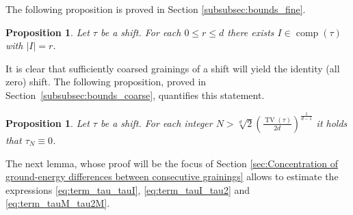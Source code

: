 \documentclass[11pt, reqno]{amsart}
\newtheorem{proposition}[theorem]{Proposition}
\DeclareMathOperator{\TV}{TV}
\DeclareMathOperator{\comp}{comp}
\numberwithin{equation}{section}
\begin{document}
The following proposition is proved in Section \ref{subsubsec:bounds_fine}. 
\begin{proposition}\label{prop:Itau}
Let $\tau$ be a shift. For each $0\le r\le d$ there exists $I\in\comp(\tau)$ with $|I|=r$.
\end{proposition}
It is clear that sufficiently coarsed grainings of a shift will yield the identity (all zero) shift. The following proposition, proved in Section~\ref{subsubsec:bounds_coarse}, quantifies this statement.
\begin{proposition}\label{prop:coarse graining to the identity}
Let $\tau$ be a shift. 
For each integer $N>\sqrt[d]{2}\left(\frac{\TV\left(\tau\right)}{2d}\right)^{\frac{1}{d-1}}$ 
it holds that 
$\tau_N\equiv 0$.
\end{proposition}
The next lemma, whose proof will be the focus of Section \ref{sec:Concentration of ground-energy differences between consecutive grainings} allows to estimate the expressions \eqref{eq:term_tau_tauI}, \eqref{eq:term_tauI_tau2} and \eqref{eq:term_tauM_tau2M}.
\end{document}

